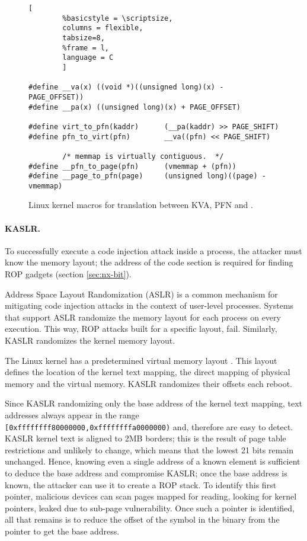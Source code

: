 \begin{figure*}[t]
                \begin{lstlisting}[
        %basicstyle = \scriptsize,
        columns = flexible,
        tabsize=8,
        %frame = l,
        language = C
        ]
        
#define __va(x) ((void *)((unsigned long)(x) - PAGE_OFFSET))
#define __pa(x) ((unsigned long)(x) + PAGE_OFFSET)

#define virt_to_pfn(kaddr)      (__pa(kaddr) >> PAGE_SHIFT)
#define pfn_to_virt(pfn)        __va((pfn) << PAGE_SHIFT)

        /* memmap is virtually contiguous.  */
#define __pfn_to_page(pfn)      (vmemmap + (pfn))  
#define __page_to_pfn(page)     (unsigned long)((page) - vmemmap)
                \end{lstlisting}
        \caption{ Linux kernel macros for translation between KVA, PFN and \page{}.
                }
        \label{fig:mem_model}
\end{figure*}

\paragraph{KASLR.}\label{sec:kaslr}

To successfully execute a code injection attack inside a process, the attacker must know the memory layout; the address of the code section is required for finding ROP gadgets (section \ref{sec:nx-bit}). 

Address Space Layout Randomization (ASLR) is a common mechanism for mitigating code injection attacks in the context of user-level processes. Systems that support ASLR randomize the memory layout for each process on every execution. This way, ROP attacks built for a specific layout, fail. Similarly, KASLR \cite{kalsr} randomizes the kernel memory layout.

The Linux kernel has a predetermined virtual memory layout \cite{mem_layout}. This layout defines the location of the kernel text mapping, the direct mapping of physical memory and the virtual memory. KASLR randomizes their offsets each reboot.

Since KASLR randomizing only the base address of the kernel text mapping, text addresses always appear in the range \texttt{[0xffffffff80000000,0xffffffffa0000000)} and, therefore are easy to detect. KASLR kernel text is aligned to 2MB borders; this is the result of page table restrictions and unlikely to change, which means that the lowest 21 bits remain unchanged. Hence, knowing even a single address of a known element is sufficient to deduce the base address and compromise KASLR; once the base address is known, the attacker can use it to create a ROP stack. To identify this first pointer, malicious devices can scan pages mapped for reading, looking for kernel pointers, leaked due to sub-page vulnerability. Once such a pointer is identified, all that remains is to reduce the offset of the symbol in the binary from the pointer to get the base address.

